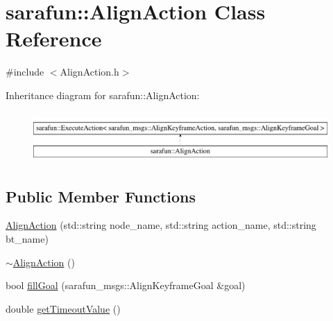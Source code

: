 \hypertarget{classsarafun_1_1AlignAction}{\section{sarafun\-:\-:Align\-Action Class Reference}
\label{classsarafun_1_1AlignAction}
}


{\ttfamily \#include $<$Align\-Action.\-h$>$}

Inheritance diagram for sarafun\-:\-:Align\-Action\-:\begin{figure}[H]
\begin{center}
\leavevmode
\includegraphics[height=1.934370cm]{classsarafun_1_1AlignAction}
\end{center}
\end{figure}
\subsection*{Public Member Functions}
\begin{DoxyCompactItemize}
\item 
\hyperlink{classsarafun_1_1AlignAction_a013ed290585167a2693728565a764205}{Align\-Action} (std\-::string node\-\_\-name, std\-::string action\-\_\-name, std\-::string bt\-\_\-name)
\item 
\hyperlink{classsarafun_1_1AlignAction_a0fdb2f1de94801608024fb7dddd84f57}{$\sim$\-Align\-Action} ()
\item 
bool \hyperlink{classsarafun_1_1AlignAction_ab92a62085ebd60438638b7b6c56da786}{fill\-Goal} (sarafun\-\_\-msgs\-::\-Align\-Keyframe\-Goal \&goal)
\item 
double \hyperlink{classsarafun_1_1AlignAction_a9b9741ec3203bdc1b2e7b7cecc96e6ed}{get\-Timeout\-Value} ()
\end{DoxyCompactItemize}


